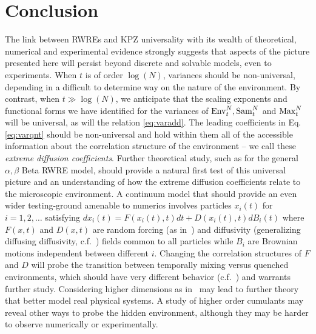 \section{Conclusion}
The link between RWREs and KPZ universality with its wealth of theoretical, numerical and experimental evidence strongly suggests that aspects of the picture presented here will persist beyond discrete and solvable models, even to experiments. When $t$ is of order $\log(N)$, variances should be non-universal, depending in a difficult to determine way on the nature of the environment. By contrast, when $t\gg\log(N)$, we anticipate that the scaling exponents and functional forms we have identified for the variances of $\mathrm{Env}^{N}_t,\mathrm{Sam}^{N}_t$ and $\mathrm{Max}^{N}_t$ will be universal, as will the relation \eqref{eq:varadd}. The leading coefficients  in Eq. \eqref{eq:varqnt} should be non-universal and hold within them all of the accessible information about the correlation structure of the environment -- we call these {\it extreme diffusion coefficients}. Further theoretical study, such as for the general $\alpha,\beta$ Beta RWRE model, should provide a natural first test of this universal picture and an understanding of how the extreme diffusion coefficients relate to the microscopic environment. A continuum model that should provide an even wider testing-ground amenable to numerics involves particles $x_i(t)$ for $i=1,2,\ldots$ satisfying $dx_i(t) = F(x_i(t),t)dt + D(x_i(t),t) dB_i(t)$ where $F(x,t)$ and $D(x,t)$ are random forcing (as in~\cite{le_doussal_diffusion_2017}) and diffusivity (generalizing diffusing diffusivity, c.f.~\cite{chechkin_brownian_2017}) fields common to all particles while $B_i$ are  Brownian motions independent between different $i$. Changing the correlation structures of $F$ and $D$ will probe the transition between temporally mixing versus quenched environments, which should have very different behavior (c.f.~\cite{noskowicz_average_1988,le_doussal_first-passage_1989}) and warrants further study. Considering higher dimensions as in~\cite{le_doussal_diffusion_2017} may lead to further theory that better model real physical systems. A study of higher order cumulants may reveal other ways to probe the hidden environment, although they may be harder to observe numerically or experimentally.

